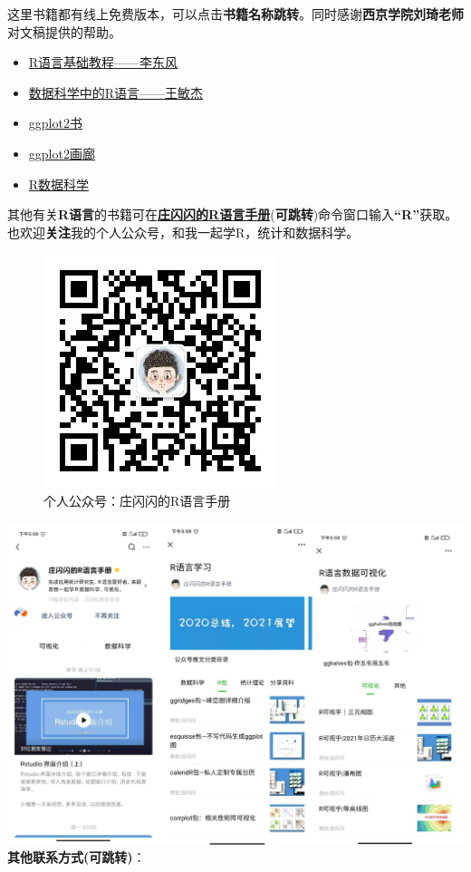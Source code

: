 \documentclass[
]{book}
\begin{document}
这里书籍都有线上免费版本，可以点击\textbf{书籍名称跳转}。同时感谢\textbf{西京学院刘琦老师}对文稿提供的帮助。

\begin{itemize}
\item
  \href{https://www.math.pku.edu.cn/teachers/lidf/docs/Rbook/html/_Rbook/graph.html}{R语言基础教程------李东风}
\item
  \href{https://bookdown.org/wangminjie/R4DS/intro-R.html\#\%E5\%AE\%89\%E8\%A3\%85-rstudio}{数据科学中的R语言------王敏杰}
\item
  \href{https://ggplot2-book.org/}{ggplot2书}
\item
  \href{https://www.r-graph-gallery.com/ggplot2-package.html}{ggplot2画廊}
\item
  \href{https://r4ds.had.co.nz/}{R数据科学}
\end{itemize}

其他有关\textbf{R语言}的书籍可在\href{https://mp.weixin.qq.com/mp/profile_ext?action=home\&__biz=MzI1NjUwMjQxMQ==\&scene=124\#wechat_redirect}{\textbf{庄闪闪的R语言手册}}(\textbf{可跳转})命令窗口输入\textbf{``R''}获取。也欢迎\textbf{关注}我的个人公众号，和我一起学R，统计和数据科学。

\begin{figure}

{\centering \includegraphics[width=0.45\linewidth]{figure/vcode} 

}

\caption{个人公众号：庄闪闪的R语言手册}\label{fig:unnamed-chunk-1}
\end{figure}

\includegraphics{figure/me.png}
\textbf{其他联系方式(可跳转)}：
\end{document}
